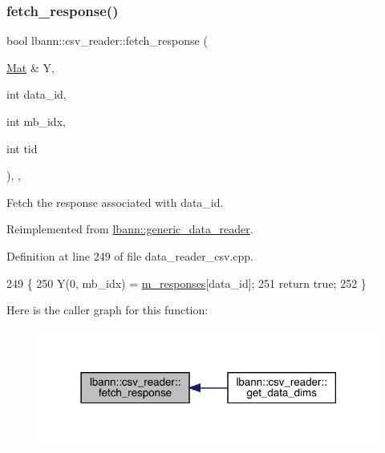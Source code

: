 \subsubsection{\texorpdfstring{fetch\+\_\+response()}{fetch\_response()}}
{\footnotesize\ttfamily bool lbann\+::csv\+\_\+reader\+::fetch\+\_\+response (\begin{DoxyParamCaption}\item[{\hyperlink{base_8hpp_a68f11fdc31b62516cb310831bbe54d73}{Mat} \&}]{Y,  }\item[{int}]{data\+\_\+id,  }\item[{int}]{mb\+\_\+idx,  }\item[{int}]{tid }\end{DoxyParamCaption})\hspace{0.3cm}{\ttfamily [override]}, {\ttfamily [protected]}, {\ttfamily [virtual]}}



Fetch the response associated with data\+\_\+id. 



Reimplemented from \hyperlink{classlbann_1_1generic__data__reader_abe544ea807eed477f3636010d199b574}{lbann\+::generic\+\_\+data\+\_\+reader}.



Definition at line 249 of file data\+\_\+reader\+\_\+csv.\+cpp.


\begin{DoxyCode}
249                                                                         \{
250   Y(0, mb\_idx) = \hyperlink{classlbann_1_1csv__reader_a8b7e23827c7cbf7c8eff40cad9cb6afc}{m\_responses}[data\_id];
251   \textcolor{keywordflow}{return} \textcolor{keyword}{true};
252 \}
\end{DoxyCode}
Here is the caller graph for this function\+:\nopagebreak
\begin{figure}[H]
\begin{center}
\leavevmode
\includegraphics[width=318pt]{classlbann_1_1csv__reader_ab4bbc1b0a9982595b89a930cc125b40b_icgraph}
\end{center}
\end{figure}
\mbox{\label{classlbann_1_1csv__reader_a6fab46f562936d43d19e0eaacf8b72c0}} 
